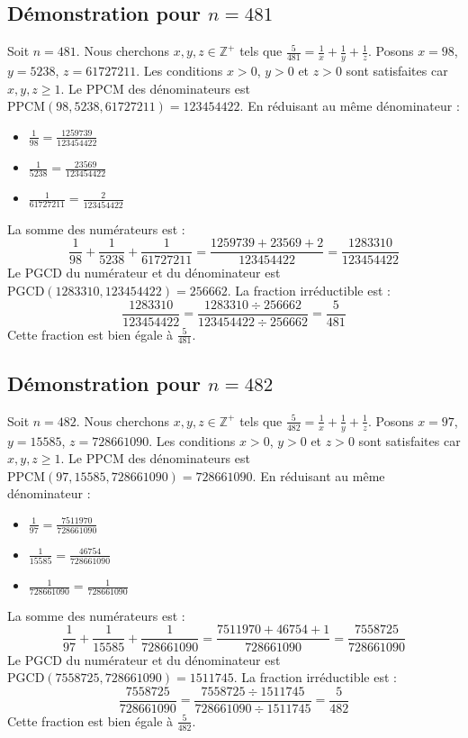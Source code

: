 \documentclass[11pt,a4paper]{article}
\begin{document}
\subsection{Démonstration pour $n = 481$}
Soit $n = 481$. Nous cherchons $x, y, z \in \mathbb{Z}^{+}$ tels que $\frac{5}{481} = \frac{1}{x} + \frac{1}{y} + \frac{1}{z}$.
Posons $x = 98$, $y = 5238$, $z = 61727211$.
Les conditions $x > 0$, $y > 0$ et $z > 0$ sont satisfaites car $x, y, z \geq 1$.
Le PPCM des dénominateurs est $\text{PPCM}(98, 5238, 61727211) = 123454422$.
En réduisant au même dénominateur :
\begin{itemize}
    \item $\frac{1}{98} = \frac{1259739}{123454422}$
    \item $\frac{1}{5238} = \frac{23569}{123454422}$
    \item $\frac{1}{61727211} = \frac{2}{123454422}$
\end{itemize}
La somme des numérateurs est :
$$ \frac{1}{98} + \frac{1}{5238} + \frac{1}{61727211} = \frac{1259739 + 23569 + 2}{123454422} = \frac{1283310}{123454422} $$
Le PGCD du numérateur et du dénominateur est $\text{PGCD}(1283310, 123454422) = 256662$.
La fraction irréductible est :
$$ \frac{1283310}{123454422} = \frac{1283310 \div 256662}{123454422 \div 256662} = \frac{5}{481} $$
Cette fraction est bien égale à $\frac{5}{481}$.

\subsection{Démonstration pour $n = 482$}
Soit $n = 482$. Nous cherchons $x, y, z \in \mathbb{Z}^{+}$ tels que $\frac{5}{482} = \frac{1}{x} + \frac{1}{y} + \frac{1}{z}$.
Posons $x = 97$, $y = 15585$, $z = 728661090$.
Les conditions $x > 0$, $y > 0$ et $z > 0$ sont satisfaites car $x, y, z \geq 1$.
Le PPCM des dénominateurs est $\text{PPCM}(97, 15585, 728661090) = 728661090$.
En réduisant au même dénominateur :
\begin{itemize}
    \item $\frac{1}{97} = \frac{7511970}{728661090}$
    \item $\frac{1}{15585} = \frac{46754}{728661090}$
    \item $\frac{1}{728661090} = \frac{1}{728661090}$
\end{itemize}
La somme des numérateurs est :
$$ \frac{1}{97} + \frac{1}{15585} + \frac{1}{728661090} = \frac{7511970 + 46754 + 1}{728661090} = \frac{7558725}{728661090} $$
Le PGCD du numérateur et du dénominateur est $\text{PGCD}(7558725, 728661090) = 1511745$.
La fraction irréductible est :
$$ \frac{7558725}{728661090} = \frac{7558725 \div 1511745}{728661090 \div 1511745} = \frac{5}{482} $$
Cette fraction est bien égale à $\frac{5}{482}$.
\end{document}
